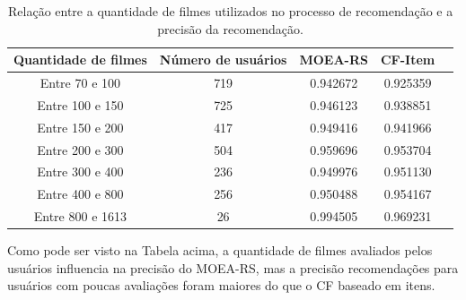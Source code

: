 \begin{table}[H]
\centering
\begin{tabular}{|c| c | c c c |}
\hline
Quantidade de filmes    & Número de usuários    & MOEA-RS   & CF-Item\\ 
\hline
Entre  70 e 100         & 719                   & 0.942672  & 0.925359\\
\hline
Entre  100 e 150        & 725                   & 0.946123  & 0.938851\\
\hline
Entre  150 e 200        & 417                   & 0.949416  & 0.941966\\
\hline
Entre  200 e 300        & 504                   & 0.959696  & 0.953704\\
\hline
Entre  300 e 400        & 236                   & 0.949976  & 0.951130\\
\hline
Entre  400 e 800        & 256                   & 0.950488  & 0.954167\\
\hline
Entre  800 e 1613       & 26                    & 0.994505  & 0.969231\\
\hline
\end{tabular}
\caption{Relação entre a quantidade de filmes utilizados no processo de recomendação e a precisão da recomendação.}
\label{tab:all_precisions}
\end{table}

Como pode ser visto na Tabela acima, a quantidade de filmes avaliados pelos usuários influencia na precisão do MOEA-RS, mas a precisão recomendações para usuários com poucas avaliações foram maiores do que o CF baseado em itens.